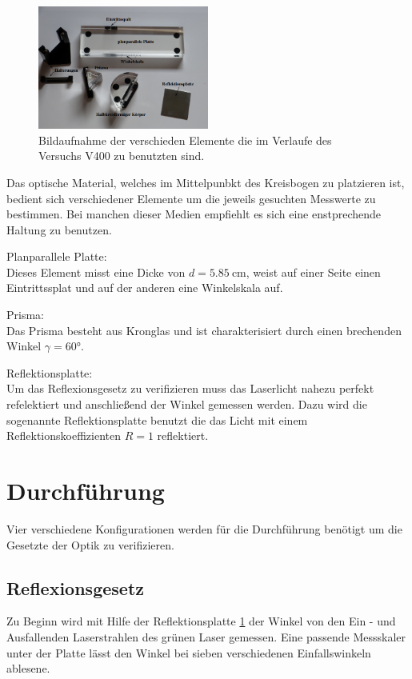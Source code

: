 \begin{figure}
    \centering
    \includegraphics[width=0.5\textwidth]{bilder/teile.png}
    \caption{Bildaufnahme der verschieden Elemente die im Verlaufe des Versuchs V400 zu benutzten sind. \cite{skript}} 
    \label{fig:teile}
\end{figure}
\FloatBarrier

Das optische Material, welches im Mittelpunbkt des Kreisbogen zu platzieren ist, bedient sich verschiedener Elemente um 
die jeweils gesuchten Messwerte zu bestimmen. Bei manchen dieser Medien empfiehlt es sich eine enstprechende Haltung zu benutzen.
\begin{description}
    \item Planparallele Platte: \\
    Dieses Element misst eine Dicke von $d = \SI{5.85}{\cm}$, weist auf einer Seite einen Eintrittssplat und auf der anderen 
    eine Winkelskala auf.
    \item Prisma: \\
    Das Prisma besteht aus Kronglas und ist charakterisiert durch einen brechenden Winkel $\gamma = 60 \si{\degree}$.
    \item Reflektionsplatte: \label{lol}\\ 
    Um das Reflexionsgesetz zu verifizieren muss das Laserlicht nahezu perfekt refelektiert und anschließend der Winkel
    gemessen werden. Dazu wird die sogenannte Reflektionsplatte benutzt die das Licht mit einem Reflektionskoeffizienten $R= 1$
    reflektiert.
\end{description}
\newpage
\section{Durchführung}
Vier verschiedene Konfigurationen werden für die Durchführung benötigt um die Gesetzte der Optik zu verifizieren.

\subsection{Reflexionsgesetz}
Zu Beginn wird mit Hilfe der Reflektionsplatte \ref{fig:teile} der Winkel von den Ein - und Ausfallenden Laserstrahlen des grünen Laser gemessen. 
Eine passende Messskaler unter der Platte lässt den Winkel bei sieben verschiedenen Einfallswinkeln ablesene.

